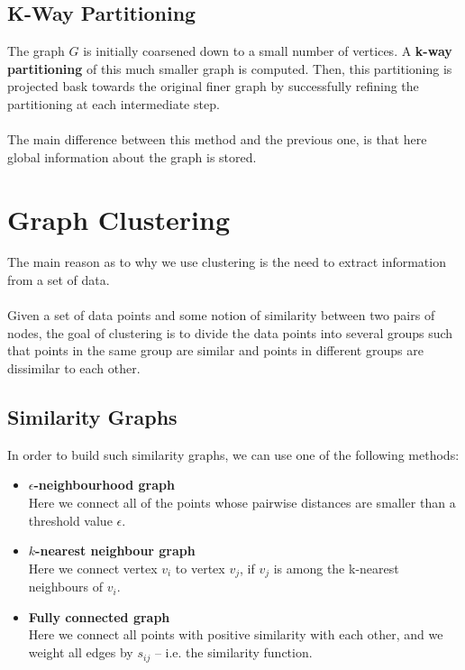 \documentclass{article}
\begin{document}
\subsection{K-Way Partitioning}
The graph $G$ is initially coarsened down to a small number of vertices. A \textbf{k-way partitioning} of this much smaller graph is computed. Then, this partitioning is projected bask towards the original finer graph by successfully refining the partitioning at each intermediate step. \\ \\
The main difference between this method and the previous one, is that here global information about the graph is stored.

\section{Graph Clustering}
The main reason as to why we use clustering is the need to extract information from a set of data. \\ \\
Given a set of data points and some notion of similarity between two pairs of nodes, the goal of clustering is to divide the data points into several groups such that points in the same group are similar and points in different groups are dissimilar to each other. 

\subsection{Similarity Graphs}
In order to build such similarity graphs, we can use one of the following methods:

\begin{itemize}
	\item \textbf{$\epsilon$-neighbourhood graph}
	\vspace{.2cm} \\
	Here we connect all of the points whose pairwise distances are smaller than a threshold value $\epsilon$.
	
	\item \textbf{$k$-nearest neighbour graph}
	\vspace{.2cm} \\
	Here we connect vertex $v_i$ to vertex $v_j$, if $v_j$ is among the k-nearest neighbours of $v_i$.
	
	\item \textbf{Fully connected graph}
	\vspace{.2cm} \\
	Here we connect all points with positive similarity with each other, and we weight all edges by $s_{ij}$ -- i.e. the similarity function.
\end{itemize}
\end{document}
